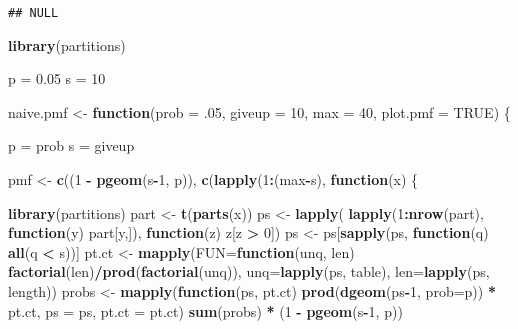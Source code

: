 \documentclass[]{article}
\newenvironment{Shaded}{\begin{snugshade}}{\end{snugshade}}
\newcommand{\KeywordTok}[1]{\textcolor[rgb]{0.13,0.29,0.53}{\textbf{#1}}}
\newcommand{\DataTypeTok}[1]{\textcolor[rgb]{0.13,0.29,0.53}{#1}}
\newcommand{\DecValTok}[1]{\textcolor[rgb]{0.00,0.00,0.81}{#1}}
\newcommand{\FloatTok}[1]{\textcolor[rgb]{0.00,0.00,0.81}{#1}}
\newcommand{\StringTok}[1]{\textcolor[rgb]{0.31,0.60,0.02}{#1}}
\newcommand{\OtherTok}[1]{\textcolor[rgb]{0.56,0.35,0.01}{#1}}
\newcommand{\ControlFlowTok}[1]{\textcolor[rgb]{0.13,0.29,0.53}{\textbf{#1}}}
\newcommand{\OperatorTok}[1]{\textcolor[rgb]{0.81,0.36,0.00}{\textbf{#1}}}
\newcommand{\NormalTok}[1]{#1}
\begin{document}
\begin{verbatim}
## NULL
\end{verbatim}

\begin{Shaded}
\begin{Highlighting}[]
\KeywordTok{library}\NormalTok{(partitions)}

\NormalTok{p =}\StringTok{ }\FloatTok{0.05}
\NormalTok{s =}\StringTok{ }\DecValTok{10}

\NormalTok{naive.pmf <-}\StringTok{ }\ControlFlowTok{function}\NormalTok{(}\DataTypeTok{prob =}\NormalTok{ .}\DecValTok{05}\NormalTok{, }\DataTypeTok{giveup =} \DecValTok{10}\NormalTok{, }\DataTypeTok{max =} \DecValTok{40}\NormalTok{, }\DataTypeTok{plot.pmf =} \OtherTok{TRUE}\NormalTok{) \{}

\NormalTok{  p =}\StringTok{ }\NormalTok{prob}
\NormalTok{  s =}\StringTok{ }\NormalTok{giveup}
  
\NormalTok{pmf <-}\StringTok{ }\KeywordTok{c}\NormalTok{((}\DecValTok{1} \OperatorTok{-}\StringTok{ }\KeywordTok{pgeom}\NormalTok{(s}\OperatorTok{-}\DecValTok{1}\NormalTok{, p)), }\KeywordTok{c}\NormalTok{(}\KeywordTok{lapply}\NormalTok{(}\DecValTok{1}\OperatorTok{:}\NormalTok{(max}\OperatorTok{-}\NormalTok{s), }\ControlFlowTok{function}\NormalTok{(x) \{}
  
  \KeywordTok{library}\NormalTok{(partitions)}
\NormalTok{  part <-}\StringTok{ }\KeywordTok{t}\NormalTok{(}\KeywordTok{parts}\NormalTok{(x)) }
\NormalTok{  ps <-}\StringTok{ }\KeywordTok{lapply}\NormalTok{(}
          \KeywordTok{lapply}\NormalTok{(}\DecValTok{1}\OperatorTok{:}\KeywordTok{nrow}\NormalTok{(part), }\ControlFlowTok{function}\NormalTok{(y) part[y,]), }\ControlFlowTok{function}\NormalTok{(z) z[z }\OperatorTok{>}\StringTok{ }\DecValTok{0}\NormalTok{])}
\NormalTok{  ps <-}\StringTok{ }\NormalTok{ps[}\KeywordTok{sapply}\NormalTok{(ps, }\ControlFlowTok{function}\NormalTok{(q) }\KeywordTok{all}\NormalTok{(q }\OperatorTok{<}\StringTok{ }\NormalTok{s))]}
\NormalTok{  pt.ct <-}\StringTok{ }\KeywordTok{mapply}\NormalTok{(}\DataTypeTok{FUN=}\ControlFlowTok{function}\NormalTok{(unq, len) }\KeywordTok{factorial}\NormalTok{(len)}\OperatorTok{/}\KeywordTok{prod}\NormalTok{(}\KeywordTok{factorial}\NormalTok{(unq)), }
       \DataTypeTok{unq=}\KeywordTok{lapply}\NormalTok{(ps, table), }
       \DataTypeTok{len=}\KeywordTok{lapply}\NormalTok{(ps, length))}
\NormalTok{  probs <-}\StringTok{ }\KeywordTok{mapply}\NormalTok{(}\ControlFlowTok{function}\NormalTok{(ps, pt.ct) }\KeywordTok{prod}\NormalTok{(}\KeywordTok{dgeom}\NormalTok{(ps}\OperatorTok{-}\DecValTok{1}\NormalTok{, }\DataTypeTok{prob=}\NormalTok{p)) }\OperatorTok{*}\StringTok{ }\NormalTok{pt.ct,}
      \DataTypeTok{ps =}\NormalTok{ ps, }\DataTypeTok{pt.ct =}\NormalTok{ pt.ct)}
  \KeywordTok{sum}\NormalTok{(probs) }\OperatorTok{*}\StringTok{ }\NormalTok{(}\DecValTok{1} \OperatorTok{-}\StringTok{ }\KeywordTok{pgeom}\NormalTok{(s}\OperatorTok{-}\DecValTok{1}\NormalTok{, p))}
  

\end{Highlighting}
\end{Shaded}
\end{document}
